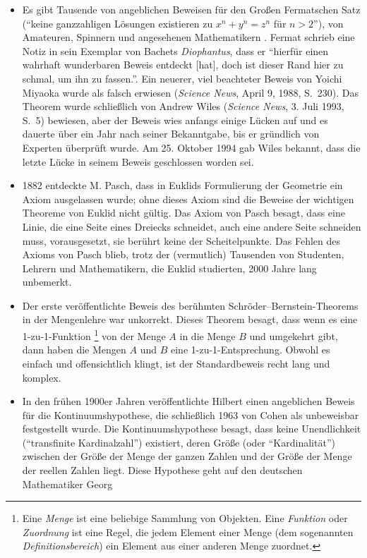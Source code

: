 \begin{itemize}
\item Es gibt Tausende von angeblichen Beweisen für den Großen Fermatschen Satz ("`keine ganzzahligen Lösungen existieren zu $x^n + y^n = z^n$ für $n > 2$"'), von Amateuren, Spinnern und angesehenen Mathematikern \cite[S.~5]{Stark}.  Fermat schrieb eine Notiz in sein Exemplar von Bachets {\em Diophantus}, dass er "`hierfür einen wahrhaft wunderbaren Beweis entdeckt [hat], doch ist dieser Rand hier zu schmal, um ihn zu fassen."'\cite[S.~507]{Kramer}.  Ein neuerer, viel beachteter Beweis von Yoichi Miyaoka wurde als falsch erwiesen ({\em Science News}, April 9, 1988, S.~230).  Das Theorem wurde schließlich von Andrew Wiles ({\em Science News}, 3. Juli 1993, S.~5) bewiesen, aber der Beweis wies anfangs einige Lücken auf und es dauerte über ein Jahr nach seiner Bekanntgabe, bis er gründlich von Experten überprüft wurde.  Am 25. Oktober 1994 gab Wiles bekannt, dass die letzte Lücke in seinem Beweis geschlossen worden sei.
\item 1882 entdeckte M. Pasch, dass in Euklids Formulierung der Geometrie ein Axiom ausgelassen wurde; ohne dieses Axiom sind die Beweise der wichtigen Theoreme von Euklid nicht gültig.  Das Axiom von Pasch besagt, dass eine Linie, die eine Seite eines Dreiecks schneidet, auch eine andere Seite schneiden muss, vorausgesetzt, sie berührt keine der Scheitelpunkte.  Das Fehlen des Axioms von Pasch blieb, trotz der (vermutlich) Tausenden von Studenten, Lehrern und Mathematikern, die Euklid studierten, 2000 Jahre lang unbemerkt.
\item Der erste veröffentlichte Beweis des berühmten Schr\"{o}der--Bernstein-Theorems in der Mengenlehre war unkorrekt\cite[p.~148]{Enderton}.  Dieses Theorem besagt, dass wenn es eine 1-zu-1-Funktion
\footnote{Eine {\em Menge} ist eine beliebige Sammlung von Objekten. Eine {\em Funktion} oder {\em Zuordnung} ist eine Regel, die jedem Element einer Menge (dem sogenannten {\em Definitionsbereich}) ein Element aus einer anderen Menge zuordnet.}
von der Menge $A$ in die Menge $B$ und umgekehrt gibt, dann haben die Mengen $A$ und $B$ eine 1-zu-1-Entsprechung.  Obwohl es einfach und offensichtlich klingt, ist der Standardbeweis recht lang und komplex.
\item In den frühen 1900er Jahren veröffentlichte Hilbert einen angeblichen Beweis für die Kontinuumshypothese, die schließlich 1963 von Cohen als unbeweisbar festgestellt wurde\cite[S.~166]{Enderton}.  Die Kontinuumshypothese besagt, dass keine Unendlichkeit ("`transfinite Kardinalzahl"') existiert, deren Größe (oder "`Kardinalität"') zwischen der Größe der Menge der ganzen Zahlen und der Größe der Menge der reellen Zahlen liegt.  Diese Hypothese geht auf den deutschen Mathematiker Georg

\end{itemize}
